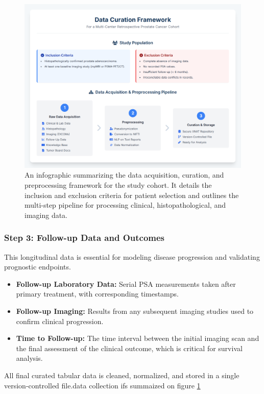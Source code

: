 \documentclass[11pt, a4paper]{article}
\begin{document}
\begin{figure}[H]
        \centering
        \includegraphics[width=\textwidth]{dc.png}
        \caption{An infographic summarizing the data acquisition, curation, and preprocessing framework for the study cohort. It details the inclusion and exclusion criteria for patient selection and outlines the multi-step pipeline for processing clinical, histopathological, and imaging data.}
        \label{fig:data_curation}
\end{figure}


\subsubsection{Step 3: Follow-up Data and Outcomes}
This longitudinal data is essential for modeling disease progression and validating prognostic endpoints.
\begin{itemize}
    \item \textbf{Follow-up Laboratory Data:} Serial PSA measurements taken after primary treatment, with corresponding timestamps.
    \item \textbf{Follow-up Imaging:} Results from any subsequent imaging studies used to confirm clinical progression.
    \item \textbf{Time to Follow-up:} The time interval between the initial imaging scan and the final assessment of the clinical outcome, which is critical for survival analysis.
\end{itemize}
All final curated tabular data is cleaned, normalized, and stored in a single version-controlled file.data collection ifs summaized on figure \ref{fig:data_curation}
\end{document}

